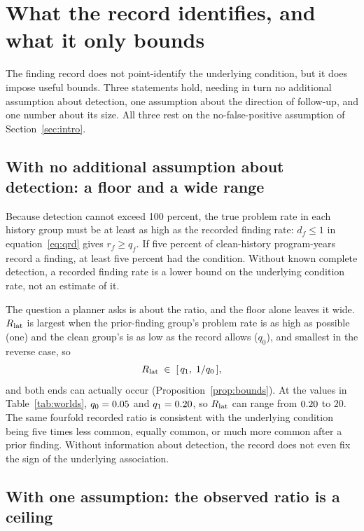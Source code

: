 \section{What the record identifies, and what it only bounds}\label{sec:bounds}

The finding record does not point-identify the underlying condition, but it
does impose useful bounds. Three statements hold, needing in turn no
additional assumption about detection, one assumption about the direction of
follow-up, and one number about its size. All three rest on the
no-false-positive assumption of Section~\ref{sec:intro}.

\subsection{With no additional assumption about detection: a floor and a wide range}

Because detection cannot exceed 100 percent, the true problem rate in each
history group must be at least as high as the recorded finding rate: $d_f \le
1$ in equation~\eqref{eq:qrd} gives $r_f \ge q_f$. If five percent of
clean-history program-years record a finding, at least five percent had the
condition. Without known complete detection, a recorded finding rate is a lower bound
on the underlying condition rate, not an estimate of it.

The question a planner asks is about the ratio, and the floor alone leaves it
wide. $R_{\mathrm{lat}}$ is largest when the prior-finding group's problem rate is as
high as possible (one) and the clean group's is as low as the record allows
($q_0$), and smallest in the reverse case, so
%
\begin{equation}\label{eq:unres}
  R_{\mathrm{lat}} \;\in\; [\,q_1,\; 1/q_0\,] ,
\end{equation}
%
and both ends can actually occur (Proposition~\ref{prop:bounds}). At the
values in Table~\ref{tab:worlds}, $q_0 = 0.05{}$ and $q_1 =
0.20{}$, so $R_{\mathrm{lat}}$ can range from $0.20{}$ to $20$. The same
fourfold recorded ratio is consistent with the underlying condition being five
times less common, equally common, or much more common after a prior finding.
Without information about detection, the record does not even fix the sign of
the underlying association.

\subsection{With one assumption: the observed ratio is a ceiling}

